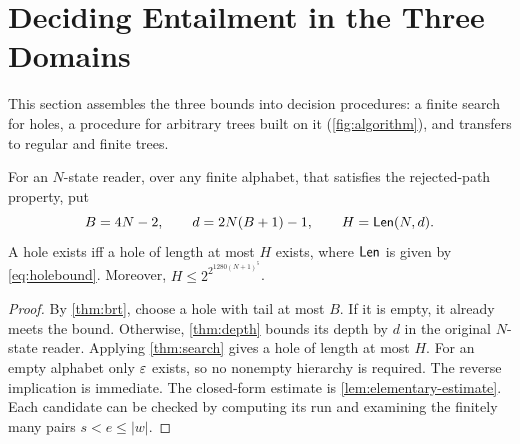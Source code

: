 \section{Deciding Entailment in the Three Domains}
\label{sec:decision}

This section assembles the three bounds into decision procedures: a finite
search for holes, a procedure for arbitrary trees built on it
(\cref{fig:algorithm}), and transfers to regular and finite trees.

\begin{theorem}\label{thm:hole-decision}
For an $N$-state reader, over any finite alphabet, that satisfies the
rejected-path property, put
\begin{equation}\label{eq:bounds}
 B=4N-2,\qquad d=2N(B+1)-1,\qquad H=\mathsf{Len}(N,d).
\end{equation}
A hole exists iff a hole of length at most $H$ exists, where $\mathsf{Len}$
is given by \eqref{eq:holebound}. Moreover,
$H\le2^{2^{1280(N+1)^5}}$.
\end{theorem}
\begin{proof}
By \cref{thm:brt}, choose a hole with tail at most $B$. If it is empty,
it already meets the bound. Otherwise, \cref{thm:depth} bounds its depth by
$d$ in the original $N$-state reader. Applying \cref{thm:search} gives a
hole of length at most $H$. For an empty alphabet only
$\varepsilon$ exists, so no nonempty hierarchy is required. The reverse implication
is immediate. The closed-form estimate is \cref{lem:elementary-estimate}.
Each candidate can be checked by computing its run and
examining the finitely many pairs $s<e\le |w|$.
\end{proof}

